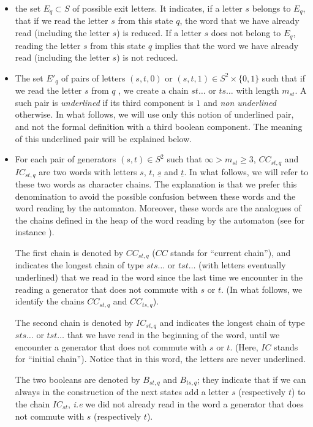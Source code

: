\documentclass[reqno,12pt]{amsart}
\theoremstyle{definition}
\begin{document}
\begin{itemize}
\item the set $E_q \subset S$ of possible exit letters. It indicates, if a letter $s$ belongs to $E_q$, that if we read  the letter $s$ from this state $q$, the word that we have already read (including the letter $s$) is reduced. If a letter $s$ does not belong to $E_q$, reading the letter $s$ from this state $q$ implies that the word we have already read (including the letter $s$) is not reduced.



\item The set $E'_q$  of pairs of letters $(s,t,0)$ or $(s,t,1)  \in S^2 \times \{0,1\}$   such that if we read the letter $s$ from $q$ , we create a chain  $st\ldots$ or $ts\ldots$ with length $m_{st}$. A such pair is \emph{underlined} if its third component is $1$ and \emph{non underlined} otherwise. In what follows, we will use only this notion of underlined pair, and not the formal definition with a third boolean component. The meaning of this underlined pair will be explained below.

\item For each pair of generators $(s,t) \in S^2$ such that $\infty>m_{st} \geq 3$, $CC_{st,q}$ and $IC_{st,q}$ are two words with letters $s$,  $t$, $\underline{s}$ and $\underline{t}$. In what follows, we will refer to these two words as character chains. The explanation is that we prefer this denomination to avoid the possible confusion between these words and the word reading by the automaton. Moreover, these words are the analogues of the chains defined in the heap of the word reading by the automaton (see for instance \cite{PET4}). 

The first chain is denoted by $CC_{st,q}$ ($CC$ stands for ``current chain''), and indicates the longest chain of type $sts\ldots$ or $tst\ldots$ (with letters eventually underlined) that we read in the word since the last time we encounter in the reading a generator that does not commute with $s$ or $t$.  (In what follows, we identify the chains $CC_{st,q}$  and $CC_{ts,q}$). 

The second chain is denoted by  $IC_{st,q}$  and indicates the longest chain of type $sts\ldots$ or $tst\ldots$ that we have read in the beginning of the word, until we encounter a generator that does not commute with $s$ or $t$.  (Here, $IC$ stands for ``initial chain''). Notice that in this word, the letters are never underlined. 

The two booleans are denoted by $B_{st,q}$ and $B_{ts,q}$; they indicate that if we can always in the construction of the next states add a letter  $s$ (respectively $t$)  to the chain $IC_{st}$, \emph{i.e} we did not already read in the word a generator that does not commute with  $s$ (respectively $t$).
\end{itemize}
\end{document}

